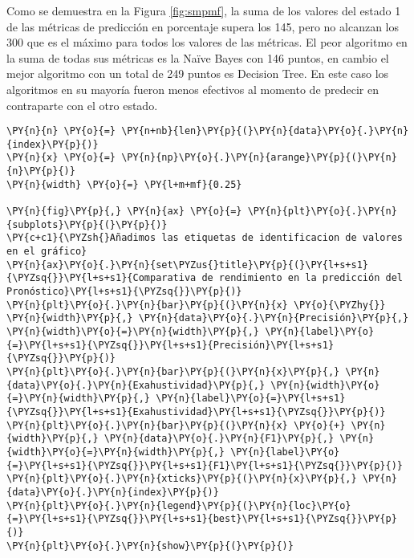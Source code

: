    Como se demuestra en la Figura \ref{fig:smpmf}, la suma de los valores del estado 1 de las métricas de predicción en porcentaje supera los 145, pero no alcanzan los 300 que es el máximo para todos los valores de las métricas. El peor algoritmo en la suma de todas sus métricas es la Naïve Bayes con 146 puntos, en cambio el mejor algoritmo con un total de 249 puntos es Decision Tree. En este caso los algoritmos en su mayoría fueron menos efectivos al momento de predecir en contraparte con el otro estado.

    \begin{tcolorbox}[breakable, size=fbox, boxrule=1pt, pad at break*=1mm,colback=cellbackground, colframe=cellborder]
\begin{Verbatim}[commandchars=\\\{\}]
\PY{n}{n} \PY{o}{=} \PY{n+nb}{len}\PY{p}{(}\PY{n}{data}\PY{o}{.}\PY{n}{index}\PY{p}{)}
\PY{n}{x} \PY{o}{=} \PY{n}{np}\PY{o}{.}\PY{n}{arange}\PY{p}{(}\PY{n}{n}\PY{p}{)}
\PY{n}{width} \PY{o}{=} \PY{l+m+mf}{0.25}

\PY{n}{fig}\PY{p}{,} \PY{n}{ax} \PY{o}{=} \PY{n}{plt}\PY{o}{.}\PY{n}{subplots}\PY{p}{(}\PY{p}{)}
\PY{c+c1}{\PYZsh{}Añadimos las etiquetas de identificacion de valores en el gráfico}
\PY{n}{ax}\PY{o}{.}\PY{n}{set\PYZus{}title}\PY{p}{(}\PY{l+s+s1}{\PYZsq{}}\PY{l+s+s1}{Comparativa de rendimiento en la predicción del Pronóstico}\PY{l+s+s1}{\PYZsq{}}\PY{p}{)}
\PY{n}{plt}\PY{o}{.}\PY{n}{bar}\PY{p}{(}\PY{n}{x} \PY{o}{\PYZhy{}} \PY{n}{width}\PY{p}{,} \PY{n}{data}\PY{o}{.}\PY{n}{Precisión}\PY{p}{,} \PY{n}{width}\PY{o}{=}\PY{n}{width}\PY{p}{,} \PY{n}{label}\PY{o}{=}\PY{l+s+s1}{\PYZsq{}}\PY{l+s+s1}{Precisión}\PY{l+s+s1}{\PYZsq{}}\PY{p}{)}
\PY{n}{plt}\PY{o}{.}\PY{n}{bar}\PY{p}{(}\PY{n}{x}\PY{p}{,} \PY{n}{data}\PY{o}{.}\PY{n}{Exahustividad}\PY{p}{,} \PY{n}{width}\PY{o}{=}\PY{n}{width}\PY{p}{,} \PY{n}{label}\PY{o}{=}\PY{l+s+s1}{\PYZsq{}}\PY{l+s+s1}{Exahustividad}\PY{l+s+s1}{\PYZsq{}}\PY{p}{)}
\PY{n}{plt}\PY{o}{.}\PY{n}{bar}\PY{p}{(}\PY{n}{x} \PY{o}{+} \PY{n}{width}\PY{p}{,} \PY{n}{data}\PY{o}{.}\PY{n}{F1}\PY{p}{,} \PY{n}{width}\PY{o}{=}\PY{n}{width}\PY{p}{,} \PY{n}{label}\PY{o}{=}\PY{l+s+s1}{\PYZsq{}}\PY{l+s+s1}{F1}\PY{l+s+s1}{\PYZsq{}}\PY{p}{)}
\PY{n}{plt}\PY{o}{.}\PY{n}{xticks}\PY{p}{(}\PY{n}{x}\PY{p}{,} \PY{n}{data}\PY{o}{.}\PY{n}{index}\PY{p}{)}
\PY{n}{plt}\PY{o}{.}\PY{n}{legend}\PY{p}{(}\PY{n}{loc}\PY{o}{=}\PY{l+s+s1}{\PYZsq{}}\PY{l+s+s1}{best}\PY{l+s+s1}{\PYZsq{}}\PY{p}{)}
\PY{n}{plt}\PY{o}{.}\PY{n}{show}\PY{p}{(}\PY{p}{)}
\end{Verbatim}
\end{tcolorbox}

